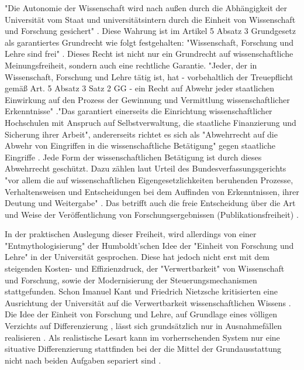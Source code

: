 \begin{enumerate}
\begin{end}
"Die Autonomie der Wissenschaft wird nach außen durch die Abhängigkeit der Universität vom Staat und universitätsintern durch die Einheit von Wissenschaft und Forschung gesichert" \cite{Huber_2005}. Diese Wahrung ist im Artikel 5 Absatz 3 Grundgesetz als garantiertes Grundrecht wie folgt festgehalten: "Wissenschaft, Forschung und Lehre sind frei" \cite{suchen_GG}. Dieses Recht ist nicht nur ein Grundrecht auf wissenschaftliche Meinungsfreiheit, sondern auch eine rechtliche Garantie. "Jeder, der in Wissenschaft, Forschung und Lehre tätig ist, hat - vorbehaltlich der Treuepflicht gemäß Art. 5 Absatz 3 Satz 2 GG - ein Recht auf Abwehr jeder staatlichen Einwirkung auf den Prozess der Gewinnung und Vermittlung wissenschaftlicher Erkenntnisse" \cite{suchen_BVG}."Das garantiert einerseits die Einrichtung wissenschaftlicher Hochschulen mit Anspruch auf Selbstverwaltung, die staatliche Finanzierung und Sicherung ihrer Arbeit"\cite{suchen_BVG}, andererseits richtet es sich als "Abwehrrecht auf die Abwehr von Eingriffen in die wissenschaftliche Betätigung" gegen staatliche Eingriffe \cite{mayen_grundrechte_forscher} \cite{spindler_2006_rechtloa}. Jede Form der wissenschaftlichen Betätigung ist durch dieses Abwehrrecht geschützt. Dazu zählen laut Urteil des Bundesverfassungsgerichts "vor allem die auf wissenschaftlichen Eigengesetzlichkeiten beruhenden Prozesse, Verhaltensweisen und Entscheidungen bei dem Auffinden von Erkenntnissen, ihrer Deutung und Weitergabe" \cite{suchen}. Das betrifft auch die freie Entscheidung über die Art und Weise der Veröffentlichung von Forschungsergebnissen (Publikationsfreiheit) \cite{Fangerau_2014}.

In der praktischen Auslegung dieser Freiheit, wird allerdings von einer "Entmythologisierung" der Humboldt’schen Idee der "Einheit von Forschung und Lehre" in der Universität gesprochen. Diese hat jedoch nicht erst mit dem steigenden Kosten- und Effizienzdruck, der "Verwertbarkeit" von Wissenschaft und Forschung, sowie der Modernisierung der Steuerungsmechanismen stattgefunden. Schon Imanuel Kant und Friedrich Nietzsche kritisierten eine Ausrichtung der Universität auf die Verwertbarkeit wissenschaftlichen Wissens \cite{Huber_2005}. Die Idee der Einheit von Forschung und Lehre, auf Grundlage eines völligen Verzichts auf Differenzierung \cite{kittler_2004}, lässt sich grundsätzlich nur in Ausnahmefällen realisieren \cite{Schimank_2001}. Als realistische Lesart kann im vorherrschenden System nur eine situative Differenzierung stattfinden bei der die Mittel der Grundausstattung nicht nach beiden Aufgaben separiert sind \cite{Schimank_2001}.


\end{end}
\end{enumerate}
